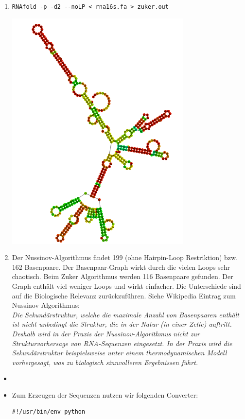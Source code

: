 \documentclass{homework}
\begin{document}
\begin{enumerate}
\begin{enumerate}
\item
\begin{verbatim}
RNAfold -p -d2 --noLP < rna16s.fa > zuker.out
\end{verbatim}

\includegraphics[scale=0.5]{../data/u8_aufg27_zuker_output}

\item
Der Nussinov-Algorithmus findet 199 (ohne Hairpin-Loop Restriktion) bzw. 162 Basenpaare. Der Basenpaar-Graph wirkt durch die vielen Loops sehr chaotisch. Beim Zuker Algorithmus werden 116 Basenpaare gefunden. 
Der Graph enthält viel weniger Loops und wirkt einfacher. 
Die Unterschiede sind auf die Biologische Relevanz zurückzuführen. Siehe Wikipedia Eintrag zum Nussinov-Algorithmus:\\
\textit{Die Sekundärstruktur, welche die maximale Anzahl von Basenpaaren enthält ist nicht unbedingt die Struktur, die in der Natur (in einer Zelle) auftritt. Deshalb wird in der Praxis der Nussinov-Algorithmus nicht zur Strukturvorhersage von RNA-Sequenzen eingesetzt. In der Praxis wird die Sekundärstruktur beispielsweise unter einem thermodynamischen Modell vorhergesagt, was zu biologisch sinnvolleren Ergebnissen führt.}

\end{enumerate}


\begin{itemize}
	\item
	\item
Zum Erzeugen der Sequenzen nutzen wir folgenden Converter:
\begin{verbatim}
#!/usr/bin/env python


\end{verbatim}
\end{itemize}
\end{enumerate}
\end{document}
